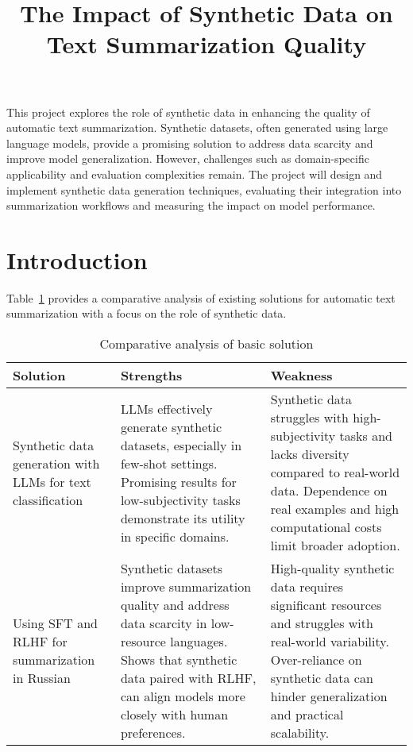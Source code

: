 \documentclass[12pt]{article}
\title{The Impact of Synthetic Data on Text Summarization Quality}
\date{}
\begin{document}
\maketitle

This project explores the role of synthetic data in enhancing the quality of automatic text summarization. Synthetic datasets, often generated using large language models, provide a promising solution to address data scarcity and improve model generalization. However, challenges such as domain-specific applicability and evaluation complexities remain. The project will design and implement synthetic data generation techniques, evaluating their integration into summarization workflows and measuring the impact on model performance.

\section{Introduction}

Table~\ref{tab:intro_comparative} provides a comparative analysis of existing solutions for automatic text summarization with a focus on the role of synthetic data.

\begin{table}[!htbp]
    \centering
    \caption{Comparative analysis of basic solution}
    \label{tab:intro_comparative}
    \begin{tabular}{p{5cm}|p{5cm}|p{5cm}}
        Solution                                                                                                                                                                                                & Strengths & Weakness \\
        \hline
        Synthetic data generation with LLMs for text classification~\cite{Li2023}                                                                                                                               &
        LLMs effectively generate synthetic datasets, especially in few-shot settings. Promising results for low-subjectivity tasks demonstrate its utility in specific domains.                                &
        Synthetic data struggles with high-subjectivity tasks and lacks diversity compared to real-world data. Dependence on real examples and high computational costs limit broader adoption.                                        \\
        \hline
        Using SFT and RLHF for summarization in Russian~\cite{Sber2024}                                                                                                                                         &
        Synthetic datasets improve summarization quality and address data scarcity in low-resource languages. Shows that synthetic data paired with RLHF, can align models more closely with human preferences. &
        High-quality synthetic data requires significant resources and struggles with real-world variability. Over-reliance on synthetic data can hinder generalization and practical scalability.                                     \\
    \end{tabular}
\end{table}

\nocite{*} %



\end{document}

